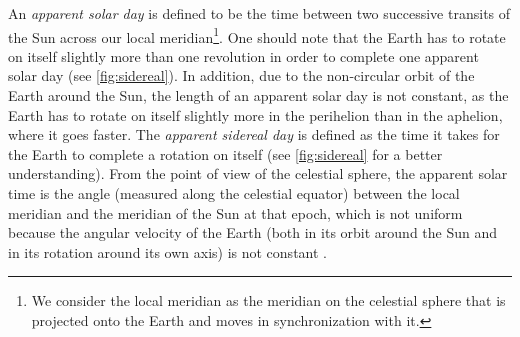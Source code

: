 \documentclass[../main.tex]{subfiles}
\begin{document}
An \emph{apparent solar day} is defined to be the time between two successive transits of the Sun across our local meridian\footnote{We consider the local meridian as the meridian on the celestial sphere that is projected onto the Earth and moves in synchronization with it.}. One should note that the Earth has to rotate on itself slightly more than one revolution in order to complete one apparent solar day (see \cref{fig:sidereal}). In addition, due to the non-circular orbit of the Earth around the Sun, the length of an apparent solar day is not constant, as the Earth has to rotate on itself slightly more in the perihelion than in the aphelion, where it goes faster. The \emph{apparent sidereal day} is defined as the time it takes for the Earth to complete a rotation on itself (see \cref{fig:sidereal} for a better understanding). From the point of view of the celestial sphere, the apparent solar time is the angle (measured along the celestial equator) between the local meridian and the meridian of the Sun at that epoch, which is not uniform because the angular velocity of the Earth (both in its orbit around the Sun and in its rotation around its own axis) is not constant \cite{montenbruck}.
\end{document}
